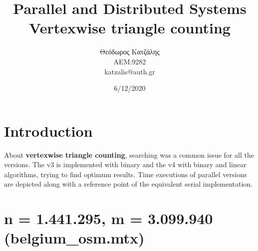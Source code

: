 \documentclass[12pt, a4paper]{article}
\title{\textbf{Parallel and Distributed Systems \\ Vertexwise triangle counting}}
\author{Θεόδωρος Κατζάλης \\ ΑΕΜ:9282 \\ katzalis@auth.gr}
\date{6/12/2020}
\begin{document}
\sloppy
%
\maketitle


\tableofcontents

\vspace{0.1cm}
\section{Introduction}
\vspace{0.2cm}
About \textbf{vertexwise triangle counting}, searching was a common issue for all the versions. The v3 is implemented with binary and the v4 with binary and linear algorithms, trying to find optimum results. Time executions of parallel versions are depicted along with a reference point  of the equivalent serial implementation.

\section{n = 1.441.295, m = 3.099.940 (belgium\_osm.mtx)}
\end{document}

